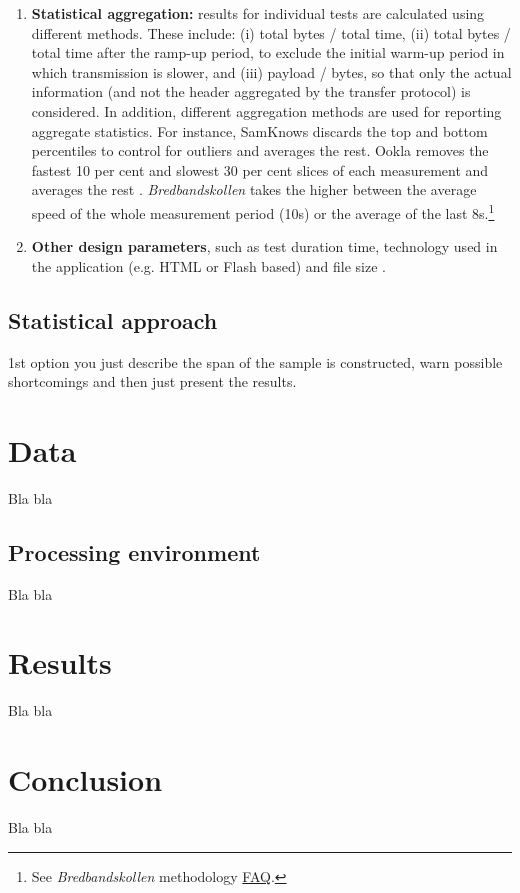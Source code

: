 \documentclass[12pt]{article}
\begin{document}
\begin{enumerate}[label=\textbf{\arabic* --}]
	\item \textbf{Statistical aggregation:} results for individual tests are calculated using different methods. These include: (i) total bytes / total time, (ii) total bytes / total time after the ramp-up period, to exclude the initial warm-up period in which transmission is slower, and (iii) payload / bytes, so that only the actual information (and not the header aggregated by the transfer protocol) is considered. In addition, different aggregation methods are used for reporting aggregate statistics. For instance, SamKnows discards the top and bottom percentiles to control for outliers and averages the rest\citep{samknows2013}. Ookla removes the fastest 10 per cent and slowest 30 per cent slices of each measurement and averages the rest \citep{bauer2010}. \textit{Bredbandskollen} takes the higher between the average speed of the whole measurement period (10s) or the average of the last 8s.\footnote{See \textit{Bredbandskollen} methodology \href{https://ensupport.bredbandskollen.se/support/solutions/articles/1000228167-how-does-the-measurement-work-in-technical-terms-}{FAQ}.}   
	
	\item \textbf{Other design parameters}, such as test duration time, technology used in the application (e.g. HTML or Flash based) and file size \citep{bauer2010,zuhyle2015}.             
	
\end{enumerate} 

  

\subsection{Statistical approach} \label{stats}
1st option you just describe the span of the sample is constructed, warn possible shortcomings and then just present the results.
\section{Data}
Bla bla
\subsection{Processing environment}
Bla bla
\section{Results}
Bla bla
\section{Conclusion}
Bla bla




\end{document}
